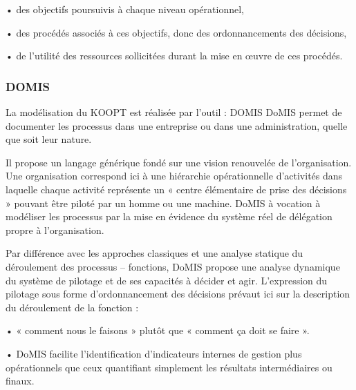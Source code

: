    • des objectifs poursuivis à chaque niveau opérationnel,
    
    • des procédés associés à ces objectifs, donc des ordonnancements des décisions,
    
    • de l'utilité des ressources sollicitées durant la mise en œuvre de ces procédés.

\subsubsection{DOMIS}


La modélisation du KOOPT est réalisée par l’outil : DOMIS
DoMIS permet de documenter les processus dans une entreprise ou dans une administration, quelle que soit leur nature.

Il propose un langage générique fondé sur une vision renouvelée de l’organisation.
Une organisation correspond ici à une hiérarchie opérationnelle d’activités dans laquelle chaque activité représente un « centre élémentaire de prise des décisions » pouvant être piloté par un homme ou une machine.
DoMIS à vocation à modéliser les processus par la mise en évidence du système réel de délégation propre à l'organisation. 

Par différence avec les approches classiques et une analyse statique du déroulement des processus – fonctions, 
DoMIS propose une analyse dynamique du système de pilotage et de ses capacités à décider et agir.
L’expression du pilotage sous forme d’ordonnancement des décisions prévaut ici sur la description du déroulement de la fonction :

• « comment nous le faisons » plutôt que « comment ça doit se faire ».

• DoMIS facilite l'identification d'indicateurs internes de gestion plus opérationnels que ceux quantifiant 
simplement les résultats intermédiaires ou finaux. \cite{domis}



